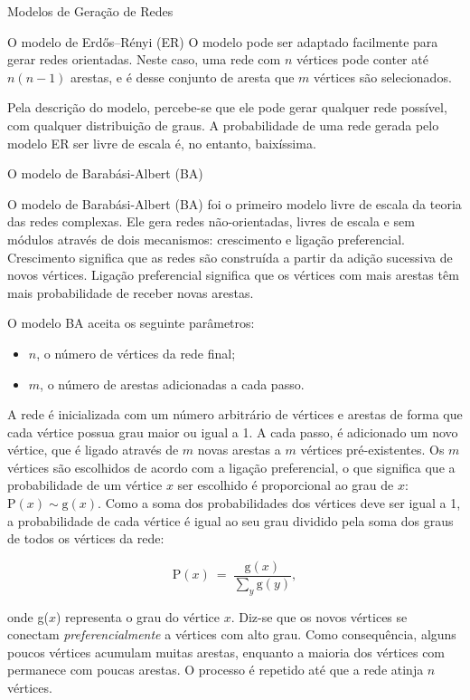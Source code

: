 \begin{section}{Modelos de Geração de Redes}
\begin{subsection}{O modelo de Erdős–Rényi (ER)}
	O modelo pode ser adaptado facilmente para gerar redes orientadas. Neste caso, uma rede com $n$ vértices pode conter até $n(n-1)$ arestas, e é desse conjunto de aresta que $m$ vértices são selecionados.
	
	Pela descrição do modelo, percebe-se que ele pode gerar qualquer rede possível, com qualquer distribuição de graus. A probabilidade de uma rede gerada pelo modelo ER ser livre de escala é, no entanto, baixíssima.

\end{subsection}

\begin{subsection}{O modelo de Barabási-Albert (BA)}	
	
	O modelo de Barabási-Albert (BA) \cite{Barabasi1999} foi o primeiro modelo livre de escala da teoria das redes complexas. Ele gera redes não-orientadas, livres de escala e sem módulos através de dois mecanismos: crescimento e ligação preferencial. Crescimento significa que as redes são construída a partir da adição sucessiva de novos vértices. Ligação preferencial significa que os vértices com mais arestas têm mais probabilidade de receber novas arestas.
	
	O modelo BA aceita os seguinte parâmetros:
	
	\begin{itemize}
		\item $n$, o número de vértices da rede final;
		\item $m$, o número de arestas adicionadas a cada passo.
	\end{itemize}
	
	A rede é inicializada com um número arbitrário de vértices e arestas de forma que cada vértice possua grau maior ou igual a 1. A cada passo, é adicionado um novo vértice, que é ligado através de $m$ novas arestas a $m$ vértices pré-existentes. Os $m$ vértices são escolhidos de acordo com a ligação preferencial, o que significa que a probabilidade de um vértice $x$ ser escolhido é proporcional ao grau de $x$: $\mathrm{P}(x) \sim \mathrm{g}(x)$. Como a soma dos probabilidades dos vértices deve ser igual a 1, a probabilidade de cada vértice é igual ao seu grau dividido pela soma dos graus de todos os vértices da rede:
	
	$$
	\mathrm{P}(x) ~=~ \frac{\mathrm{g}(x)}{\sum_y \mathrm{g}(y)},
	$$
	
	onde g($x$) representa o grau do vértice $x$. Diz-se que os novos vértices se conectam \emph{preferencialmente} a vértices com alto grau. Como consequência, alguns poucos vértices acumulam muitas arestas, enquanto a maioria dos vértices com permanece com poucas arestas. O processo é repetido até que a rede atinja $n$ vértices.
	

\end{subsection}
\end{section}
